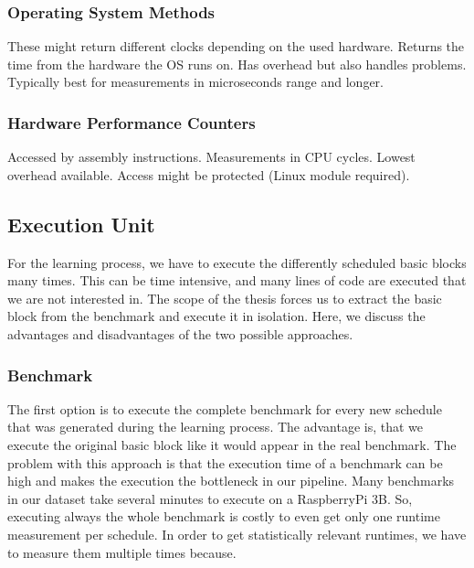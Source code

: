 \subsubsection{Operating System Methods}
These might return different clocks depending on the used hardware.
Returns the time from the hardware the OS runs on.
Has overhead but also handles problems.
Typically best for measurements in microseconds range and longer.
\subsubsection{Hardware Performance Counters}
Accessed by assembly instructions.
Measurements in CPU cycles.
Lowest overhead available.
Access might be protected (Linux module required).

\subsection{Execution Unit}
\label{sec:approach:exec_unit}
For the learning process, we have to execute the differently scheduled basic blocks many times.
This can be time intensive, and many lines of code are executed that we are not interested in.
The scope of the thesis forces us to extract the basic block from the benchmark and execute it in isolation.
Here, we discuss the advantages and disadvantages of the two possible approaches.

\subsubsection{Benchmark}
The first option is to execute the complete benchmark for every new schedule that was generated during the learning process.
The advantage is, that we execute the original basic block like it would appear in the real benchmark.
The problem with this approach is that the execution time of a benchmark can be high and makes the execution the bottleneck in our pipeline.
Many benchmarks in our dataset take several minutes to execute on a RaspberryPi 3B.
So, executing always the whole benchmark is costly to even get only one runtime measurement per schedule.
In order to get statistically relevant runtimes, we have to measure them multiple times because.

